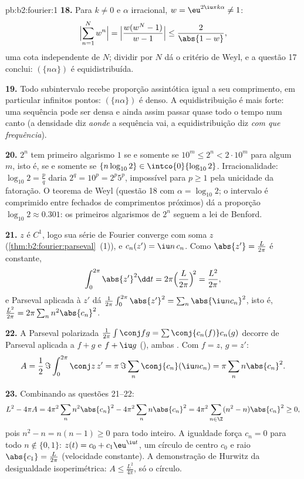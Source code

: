 \begin{solution}{pb:b2:fourier:1}
\textbf{18.} Para $k \neq 0$ e $\alpha$ irracional, $w =
\eu^{2\iu\pi k\alpha} \neq 1$:
\[
\Bigl|\sum_{n=1}^{N}w^n\Bigr|
= \Bigl|\frac{w(w^N - 1)}{w - 1}\Bigr|
\leq \frac{2}{\abs{1 - w}} ,
\]
uma cota independente de $N$; dividir por $N$ dá o critério de
Weyl, e a questão 17 conclui: $(\{n\alpha\})$ é
equidistribuída.

\textbf{19.} Todo subintervalo recebe proporção assintótica
igual a seu comprimento, em particular infinitos pontos:
$(\{n\alpha\})$ é denso. A equidistribuição é mais forte: uma
sequência pode ser densa e ainda assim passar quase todo o tempo num
canto (a densidade diz \emph{aonde} a sequência vai,
a equidistribuição diz \emph{com que frequência}).

\textbf{20.} $2^n$ tem primeiro algarismo $1$ se e somente se $10^m \leq 2^n <
2\cdot10^m$ para algum $m$, isto é, se e somente se $\{n\log_{10}2\} \in
\intco{0}{\log_{10}2}$. Irracionalidade: $\log_{10}2 =
\frac pq$ daria $2^q = 10^p = 2^p5^p$, impossível para $p
\geq 1$ pela unicidade da fatoração. O teorema de Weyl (questão 18
com $\alpha = \log_{10}2$; o intervalo  é comprimido
entre fechados de comprimentos próximos) dá a proporção
$\log_{10}2 \approx 0.301$: os primeiros algarismos de $2^n$ seguem
a lei de Benford.

\textbf{21.} $z$ é $C^1$, logo sua série de Fourier converge
 com soma $z$ (\cref{thm:b2:fourier:parseval}~(1)),
e $c_n(z') = \iu n\,c_n$. Como $\abs{z'} = \frac{L}{2\pi}$
é constante,
\[
\int_0^{2\pi}\abs{z'}^2\dd t
= 2\pi\Bigl(\frac{L}{2\pi}\Bigr)^{\!2}
= \frac{L^2}{2\pi} ,
\]
e Parseval aplicada à  $z'$ dá
$\frac{1}{2\pi}\int_0^{2\pi}\abs{z'}^2 =
\sum_n\abs{\iu nc_n}^2$, isto é, $\frac{L^2}{2\pi} = 2\pi\sum_n
n^2\abs{c_n}^2$.

\textbf{22.} A Parseval polarizada $\frac{1}{2\pi}\int\conj
fg = \sum\conj{c_n(f)}c_n(g)$ decorre de Parseval aplicada a
$f + g$ e $f + \iu g$ (), ambas
. Com $f = z$, $g = z'$:
\[
A = \frac12\,\Im\int_0^{2\pi}\conj z\,z'
= \pi\,\Im\sum_n\conj{c_n}(\iu n c_n)
= \pi\sum_n n\abs{c_n}^2 .
\]

\textbf{23.} Combinando as questões 21--22:
\[
L^2 - 4\pi A
= 4\pi^2\sum_n n^2\abs{c_n}^2 -
4\pi^2\sum_n n\abs{c_n}^2
= 4\pi^2\sum_{n\in\Z}(n^2 - n)\abs{c_n}^2 \geq 0 ,
\]
pois $n^2 - n = n(n-1) \geq 0$ para todo inteiro. A igualdade
força $c_n = 0$ para todo $n \notin \{0, 1\}$: $z(t) = c_0 +
c_1\eu^{\iu t}$, um círculo de centro $c_0$ e raio
$\abs{c_1} = \frac{L}{2\pi}$ (velocidade constante). A demonstração de Hurwitz
da desigualdade isoperimétrica: $A \leq \frac{L^2}{4\pi}$,
só o círculo.


\end{solution}
